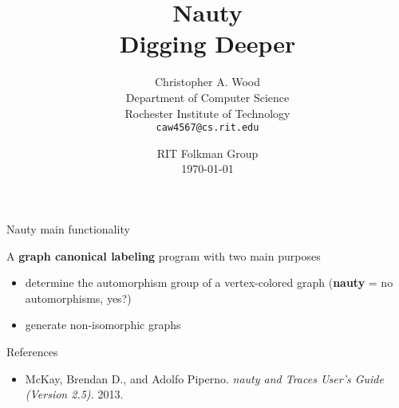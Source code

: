 \documentclass{beamer}
\title
{Nauty \\
Digging Deeper}
\author[caw rit]
{Christopher A. Wood\\
{\small Department of Computer Science}\\
{\small Rochester Institute of Technology}\\
{\small\tt caw4567@cs.rit.edu}}
\date[] %
{RIT Folkman Group\\ \today}
\begin{document}
\begin{frame}
  \titlepage
\end{frame}


\begin{frame}{Nauty}
{main functionality}

A \textbf{graph canonical labeling} program with two main purposes

\bigskip
\begin{itemize}
\item
determine the automorphism group of a vertex-colored graph (\textbf{nauty} = no automorphisms, yes?)
\item
generate non-isomorphic graphs
\end{itemize}


\end{frame}
\begin{frame}{References}

\begin{itemize}
\item
McKay, Brendan D., and Adolfo Piperno. \emph{nauty and Traces User's Guide (Version 2.5).} 2013.
\end{itemize}
\end{frame}

\end{document}
